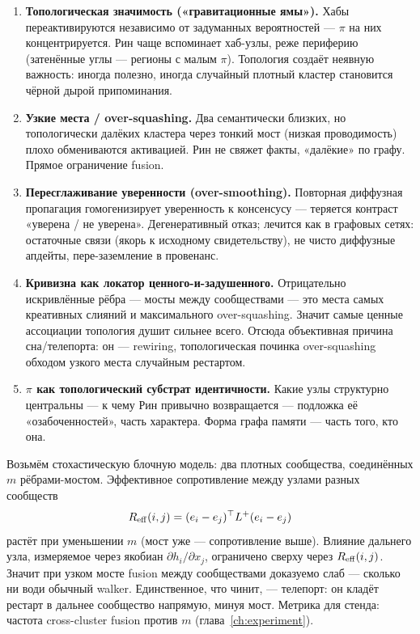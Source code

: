 \begin{enumerate}
\item \textbf{Топологическая значимость («гравитационные ямы»).}
Хабы переактивируются независимо от задуманных вероятностей --- $\pi$ на них
концентрируется. Рин чаще вспоминает хаб-узлы, реже периферию (затенённые углы
--- регионы с малым $\pi$). Топология создаёт неявную важность: иногда
полезно, иногда случайный плотный кластер становится чёрной дырой припоминания.

\item \textbf{Узкие места / over-squashing.}
Два семантически близких, но топологически далёких кластера через тонкий мост
(низкая проводимость) плохо обмениваются активацией. Рин не свяжет факты,
«далёкие» по графу. Прямое ограничение fusion.

\item \textbf{Пересглаживание уверенности (over-smoothing).}
Повторная диффузная пропагация гомогенизирует уверенность к консенсусу ---
теряется контраст «уверена / не уверена». Дегенеративный отказ; лечится как в
графовых сетях: остаточные связи (якорь к исходному свидетельству), не чисто
диффузные апдейты, пере-заземление в провенанс.

\item \textbf{Кривизна как локатор ценного-и-задушенного.}
Отрицательно искривлённые рёбра --- мосты между сообществами --- это места
самых креативных слияний и максимального over-squashing. Значит самые ценные
ассоциации топология душит сильнее всего. Отсюда объективная причина
сна/телепорта: он --- rewiring, топологическая починка over-squashing обходом
узкого места случайным рестартом.

\item \textbf{$\pi$ как топологический субстрат идентичности.}
Какие узлы структурно центральны --- к чему Рин привычно возвращается ---
подложка её «озабоченностей», часть характера. Форма графа памяти --- часть
того, кто она.
\end{enumerate}

\begin{workedbox}
Возьмём стохастическую блочную модель: два плотных сообщества, соединённых
$m$ рёбрами-мостом. Эффективное сопротивление между узлами разных сообществ
\[
R_{\mathrm{eff}}(i,j) = (e_i - e_j)^{\top} L^{+}(e_i - e_j)
\]
растёт при уменьшении $m$ (мост уже --- сопротивление выше). Влияние дальнего
узла, измеряемое через якобиан $\partial h_i / \partial x_j$, ограничено сверху
через $R_{\mathrm{eff}}(i,j)$. Значит при узком мосте fusion между сообществами доказуемо
слаб --- сколько ни води обычный walker. Единственное, что чинит, --- телепорт:
он кладёт рестарт в дальнее сообщество напрямую, минуя мост. Метрика для
стенда: частота cross-cluster fusion против $m$ (глава~\ref{ch:experiment}).
\end{workedbox}


